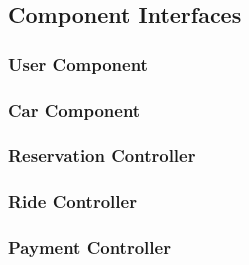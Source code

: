 \documentclass[a4paper]{article}
\begin{document}
\newpage
\subsection{Component Interfaces}

\subsubsection{User Component}
\begin{figure}[h]
\centering
\vspace*{\fill}
\noindent{}%
\vspace*{0.1cm}
\end{figure}

\subsubsection{Car Component}
\begin{figure}[h]
\centering
\vspace*{\fill}
\noindent{}%
\vspace*{0.1cm}
\end{figure}

\subsubsection{Reservation Controller}
\begin{figure}[h]
\centering
\vspace*{\fill}
\noindent{}%
\vspace*{0.1cm}
\end{figure}
\newpage

\subsubsection{Ride Controller}
\begin{figure}[h]
\centering
\vspace*{\fill}
\noindent{}%
\vspace*{0.1cm}
\end{figure}

\subsubsection{Payment Controller}
\begin{figure}[h]
\centering
\vspace*{\fill}
\noindent{}%
\vspace*{0.1cm}
\end{figure}
\end{document}
